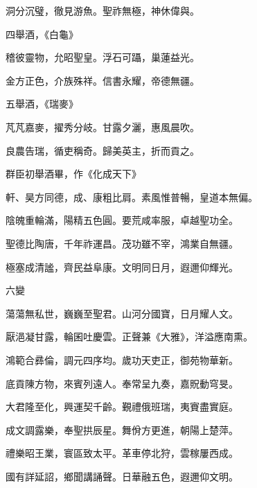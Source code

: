\begin{pinyinscope}
 洞分沉璧，徹見游魚。聖祚無極，神休偉與。



 四舉酒，《白龜》



 稽彼靈物，允昭聖皇。浮石可躡，巢蓮益光。



 金方正色，介族殊祥。信書永耀，帝德無疆。



 五舉酒，《瑞麥》



 芃芃嘉麥，擢秀分岐。甘露夕灑，惠風晨吹。



 良農告瑞，循吏稱奇。歸美英主，折而貢之。



 群臣初舉酒畢，作《化成天下》



 軒、昊方同德，成、康粗比肩。素風惟普暢，皇道本無偏。



 陰魄重輪滿，陽精五色圓。要荒咸率服，卓越聖功全。



 聖德比陶唐，千年祚運昌。茂功雖不宰，鴻業自無疆。



 極塞成清謐，齊民益阜康。文明同日月，遐邇仰輝光。



 六變



 蕩蕩無私世，巍巍至聖君。山河分國寶，日月耀人文。



 厭浥凝甘露，輪囷吐慶雲。正聲兼《大雅》，洋溢應南熏。



 鴻範合彞倫，調元四序均。歲功天吏正，御苑物華新。



 底貢陳方物，來賓列遠人。奉常呈九奏，嘉貺動穹旻。



 大君隆至化，興運契千齡。覲禮俄班瑞，夷賨盡實庭。



 成文調露樂，奉聖拱辰星。舞佾方更進，朝陽上楚萍。



 禮樂昭王業，寰區致太平。革車停北狩，雲稼屢西成。



 國有詳延詔，鄉聞講誦聲。日華融五色，遐邇仰文明。




\end{pinyinscope}
